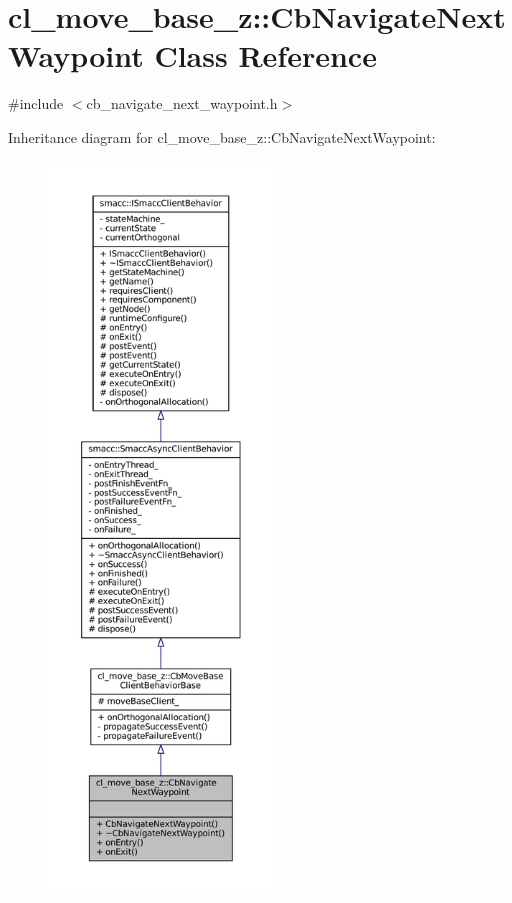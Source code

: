 \hypertarget{classcl__move__base__z_1_1CbNavigateNextWaypoint}{}\section{cl\+\_\+move\+\_\+base\+\_\+z\+:\+:Cb\+Navigate\+Next\+Waypoint Class Reference}
\label{classcl__move__base__z_1_1CbNavigateNextWaypoint}


{\ttfamily \#include $<$cb\+\_\+navigate\+\_\+next\+\_\+waypoint.\+h$>$}



Inheritance diagram for cl\+\_\+move\+\_\+base\+\_\+z\+:\+:Cb\+Navigate\+Next\+Waypoint\+:
\nopagebreak
\begin{figure}[H]
\begin{center}
\leavevmode
\includegraphics[height=550pt]{classcl__move__base__z_1_1CbNavigateNextWaypoint__inherit__graph}
\end{center}
\end{figure}


